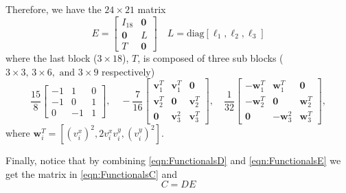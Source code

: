 Therefore, we have the $24\times 21$ matrix 
\begin{equation*}
  E = \begin{bmatrix} I_{18} & \mathbf{0} \\
    \mathbf{0} & L \\
    T & \mathbf{0}
  \end{bmatrix} \quad L = \text{diag}[\ell_1,\ell_2,\ell_3]
\end{equation*}
where the last block ($3\times 18$), $T$, is composed of three sub blocks ($3\times 3,\, 3\times
6,\text{ and } 3\times 9$ respectively)
\begin{equation*}
  \frac{15}{8} \begin{bmatrix} -1 & 1 & 0\\ -1 & 0 & 1\\ 0 & -1 & 1\end{bmatrix}, \quad 
  -\frac{7}{16} \begin{bmatrix} \mathbf{v}_1^T & \mathbf{v}_1^T & \mathbf{0}\\
    \mathbf{v}_2^T & \mathbf{0} & \mathbf{v}_2^T\\ \mathbf{0} & \mathbf{v}_3^2 & \mathbf{v}_3^T\end{bmatrix}, \quad 
  \frac{1}{32} \begin{bmatrix} -\mathbf{w}_1^T & \mathbf{w}_1^T & \mathbf{0}\\
    -\mathbf{w}_2^T & \mathbf{0} & \mathbf{w}_2^T\\ \mathbf{0} & -\mathbf{w}_3^2 & \mathbf{w}_3^T\end{bmatrix}, 
\end{equation*}
where $\mathbf{w}_i^T = \left[ (v^x_i)^2, 2v^x_i v^y_i, (v^y_i)^2\right]$. 

Finally, notice that by combining \eqref{eqn:FunctionalsD} and \eqref{eqn:FunctionalsE}
we get the matrix in \eqref{eqn:FunctionalsC} and 
\begin{equation}
  C=DE
  \label{eqn:Transformation}
\end{equation}

